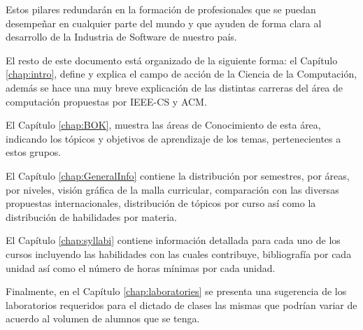 Estos pilares redundarán en la formación de profesionales que se puedan desempeñar en 
cualquier parte del mundo y que ayuden de forma clara al desarrollo de la Industria 
de Software de nuestro paí­s. 

\OtherKeyStones

El resto de este documento está organizado de la siguiente forma: el Capí­tulo \ref{chap:intro}, 
define y explica el campo de acción de la Ciencia de la Computación, 
además se hace una muy breve explicación de las distintas carreras del área de 
computación propuestas por IEEE-CS y ACM.




El Capí­tulo \ref{chap:BOK}, muestra las áreas de Conocimiento de esta área, 
indicando los tópicos y objetivos de aprendizaje de los temas, pertenecientes a estos grupos.

El Capí­tulo \ref{chap:GeneralInfo} contiene la distribución por semestres, por áreas, por niveles, 
visión gráfica de la malla curricular, comparación con las diversas propuestas internacionales, 
distribución de tópicos por curso así­ como la distribución de habilidades por materia.

El Capí­tulo \ref{chap:syllabi} contiene información detallada para cada uno de los cursos 
incluyendo las habilidades con las cuales contribuye, bibliografí­a por cada unidad así­ 
como el número de horas mí­nimas por cada unidad.


Finalmente, en el Capí­tulo \ref{chap:laboratories} se presenta una sugerencia de los laboratorios 
requeridos para el dictado de clases las mismas que podrí­an variar de acuerdo al volumen de alumnos que se tenga.

\newpage